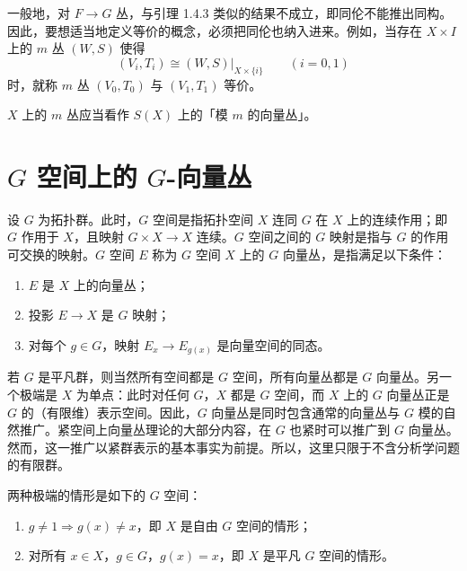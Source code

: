 一般地，对 $F\to G$ 丛，与引理 1.4.3 类似的结果不成立，即同伦不能推出同构。因此，要想适当地定义等价的概念，必须把同伦也纳入进来。例如，当存在 $X\times I$ 上的 $m$ 丛 $(W,S)$ 使得
\[
(V_i,T_i)\cong(W,S)|_{X\times\{i\}}\qquad(i=0,1)
\]
时，就称 $m$ 丛 $(V_0,T_0)$ 与 $(V_1,T_1)$ 等价。

\begin{remark}{}
  $X$ 上的 $m$ 丛应当看作 $S(X)$ 上的「模 $m$ 的向量丛」。
\end{remark}


\section{$G$ 空间上的 $G$-向量丛}

设 $G$ 为拓扑群。此时，$G$ 空间是指拓扑空间 $X$ 连同 $G$ 在 $X$ 上的连续作用；即 $G$ 作用于 $X$，且映射 $G\times X\to X$ 连续。$G$ 空间之间的 $G$ 映射是指与 $G$ 的作用可交换的映射。$G$ 空间 $E$ 称为 $G$ 空间 $X$ 上的 $G$ 向量丛，是指满足以下条件：

\begin{enumerate}[label=(\roman*),leftmargin=2.2em,itemsep=2pt]
\item $E$ 是 $X$ 上的向量丛；
\item 投影 $E\to X$ 是 $G$ 映射；
\item 对每个 $g\in G$，映射 $E_x\to E_{g(x)}$ 是向量空间的同态。
\end{enumerate}

若 $G$ 是平凡群，则当然所有空间都是 $G$ 空间，所有向量丛都是 $G$ 向量丛。另一个极端是 $X$ 为单点：此时对任何 $G$，$X$ 都是 $G$ 空间，而 $X$ 上的 $G$ 向量丛正是 $G$ 的（有限维）表示空间。因此，$G$ 向量丛是同时包含通常的向量丛与 $G$ 模的自然推广。紧空间上向量丛理论的大部分内容，在 $G$ 也紧时可以推广到 $G$ 向量丛。然而，这一推广以紧群表示的基本事实为前提。所以，这里只限于不含分析学问题的有限群。

两种极端的情形是如下的 $G$ 空间：

\begin{enumerate}[label=(\roman*),leftmargin=2.2em,itemsep=2pt]
\item $g\neq 1\Rightarrow g(x)\neq x$，即 $X$ 是自由 $G$ 空间的情形；
\item 对所有 $x\in X$，$g\in G$，$g(x)=x$，即 $X$ 是平凡 $G$ 空间的情形。
\end{enumerate}

